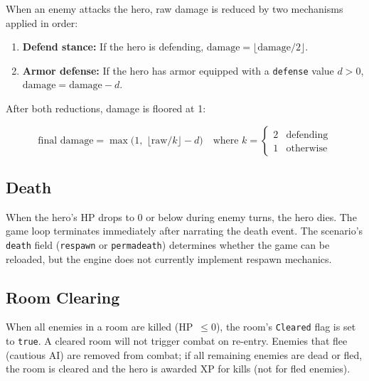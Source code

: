 \documentclass[a4paper,10pt]{article}
\newcommand{\field}[1]{\texttt{#1}}
\begin{document}
When an enemy attacks the hero, raw damage is reduced by two mechanisms
applied in order:

\begin{enumerate}[nosep]
  \item \textbf{Defend stance:} If the hero is defending,
        $\text{damage} = \lfloor \text{damage} / 2 \rfloor$.
  \item \textbf{Armor defense:} If the hero has armor equipped with a
        \field{defense} value $d > 0$, $\text{damage} = \text{damage} - d$.
\end{enumerate}

After both reductions, damage is floored at 1:

\[
  \text{final damage} = \max\!\big(1,\; \lfloor \text{raw} / k \rfloor - d\big)
  \quad \text{where } k = \begin{cases} 2 & \text{defending} \\ 1 & \text{otherwise} \end{cases}
\]

\subsection{Death}

When the hero's HP drops to 0 or below during enemy turns, the hero dies.
The game loop terminates immediately after narrating the death event.
The scenario's \field{death} field (\texttt{respawn} or \texttt{permadeath})
determines whether the game can be reloaded, but the engine does not
currently implement respawn mechanics.

\subsection{Room Clearing}

When all enemies in a room are killed (HP~$\leq 0$), the room's
\field{Cleared} flag is set to \texttt{true}. A cleared room will not
trigger combat on re-entry. Enemies that flee (cautious AI) are removed
from combat; if all remaining enemies are dead or fled, the room is cleared
and the hero is awarded XP for kills (not for fled enemies).

\end{document}
